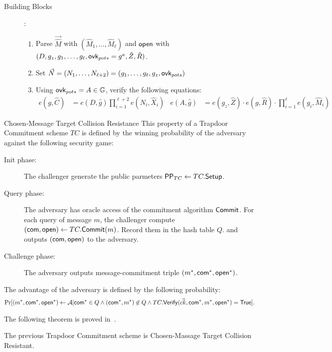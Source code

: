 \begin{subsection}{Building Blocks}
\begin{description}
  \item[] :
    \begin{enumerate}
    \item Parse $\vec{\hat{M}}$ with $(\hat{M}_1, \dots, \hat{M}_\ell)$ and $\mathsf{open}$ with $(D, g_z, g_1, \dots, g_\ell, \mathsf{ovk}_{pots} = g^a, \hat{Z}, \hat{R})$.
    \item Set $\vec{N} = (N_1, \dots, N_{\ell+2}) = (g_1, \dots, g_\ell, g_z, \mathsf{ovk}_{pots})$
    \item Using $\mathsf{ovk}_{pots} = A \in \mathbb{G}$, verify the following equations:
      \begin{align*}
	e(g, \hat{C}) &= e(D, \hat{g}) \prod_{i = 1}^{\ell+2} e(N_i, \hat{X}_i) & e(A, \hat{g}) &= e(g_z, \hat{Z}) \cdot e(g, \hat{R}) \cdot \prod_{i = 1}^\ell e(g_i, \hat{M}_i) 
      \end{align*}
    \end{enumerate}
  \end{description}

  \begin{myDef}{Chosen-Message Target Collision Resistance} This property of a Trapdoor Commitment scheme $TC$ is defined by the winning probability of the adversary against the following security game:
    \begin{description}
    \item[Init phase:] The challenger generate the public parmeters $\mathsf{PP}_{TC} \gets TC.{\mathsf{Setup}}$.
    \item[Query phase:] The adversary has oracle access of the commitment algorithm ${\mathsf{Commit}}$. For each query of message $m$, the challenger compute $(\mathsf{com}, \mathsf{open}) \gets TC.{\mathsf{Commit}}(m)$. Record them in the hash table $Q$. and outputs $(\mathsf{com}, \mathsf{open})$ to the adversary.
    \item[Challenge phase:] The adversary outputs message-commitment triple $(m^*, \mathsf{com}^*, \mathsf{open}^*)$.
    \end{description}
    The advantage of the adversary is defined by the following probability:
    \begin{align*}
      \operatorname{Pr}[(m^*, \mathsf{com}^*, \mathsf{open}^*) \gets \mathcal{A} | \mathsf{com}^* \in Q \wedge (\mathsf{com}^*, m^*) \not \in Q \wedge TC.{\mathsf{Verify}}(\vec{ck}, \mathsf{com}^*, m^*, \mathsf{open}^*) = \mathsf{True}].
    \end{align*}
  \end{myDef}

  The following theorem is proved in~\cite{DBLP:conf/eurocrypt/AbeKOT15}.

  \begin{myTh}
    The previous Trapdoor Commitment scheme is Chosen-Massage Target Collision Resistant.
  \end{myTh}

  

\end{subsection}


